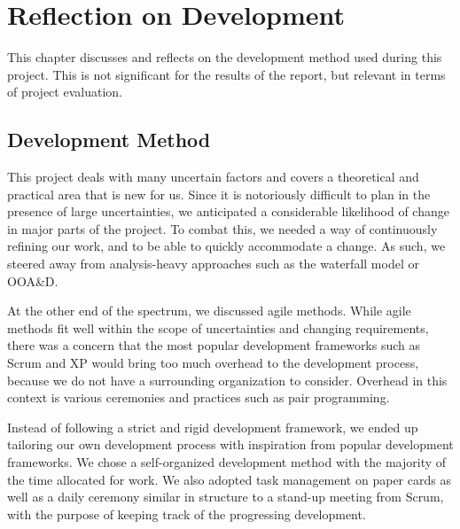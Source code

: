 \chapter{Reflection on Development}\label{chap:devmethodreflection}
This chapter discusses and reflects on the development method used during this project. This is not significant for the results of the report, but relevant in terms of project evaluation.

\section{Development Method}
This project deals with many uncertain factors and covers a theoretical and practical area that is new for us. Since it is notoriously difficult to plan in the presence of large uncertainties, we anticipated a considerable likelihood of change in major parts of the project. To combat this, we needed a way of continuously refining our work, and to be able to quickly accommodate a change. As such, we steered away from analysis-heavy approaches such as the waterfall model or OOA\&D\@.

At the other end of the spectrum, we discussed agile methods. While agile methods fit well within the scope of uncertainties and changing requirements, there was a concern that the most popular development frameworks such as Scrum and XP would bring too much overhead to the development process, because we do not have a surrounding organization to consider. Overhead in this context is various ceremonies and practices such as pair programming. %

Instead of following a strict and rigid development framework, we ended up tailoring our own development process with inspiration from popular development frameworks. We chose a self-organized development method with the majority of the time allocated for work. We also adopted task management on paper cards as well as a daily ceremony similar in structure to a stand-up meeting from Scrum, with the purpose of keeping track of the progressing development.

